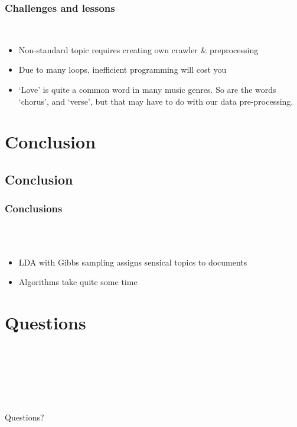 \documentclass[t,ignorenonframetext]{beamer}
\begin{document}
\begin{frame}
\frametitle{Challenges and lessons}~\\
\begin{itemize}
	\item Non-standard topic requires creating own crawler \& preprocessing
	\item Due to many loops, inefficient programming will cost you
	\item `Love' is quite a common word in many music genres. So are the words `chorus', and `verse', but that may have to do with our data pre-processing.
\end{itemize}
\end{frame}

\section{Conclusion}
\subsection{Conclusion}
\begin{frame}
\frametitle{Conclusions}~\\~\\
\begin{itemize}
\setlength{\itemsep}{10pt}\setlength{\itemsep}{5pt}
\item LDA with Gibbs sampling assigns sensical topics to documents
\item Algorithms take quite some time

\end{itemize}
\end{frame}

\section[Questions]{Questions}
\begin{frame}
~ \\~ \\~ \\ ~ \\~ \\
\begin{center}\Huge Questions? \end{center} 
\end{frame}
\end{document}
